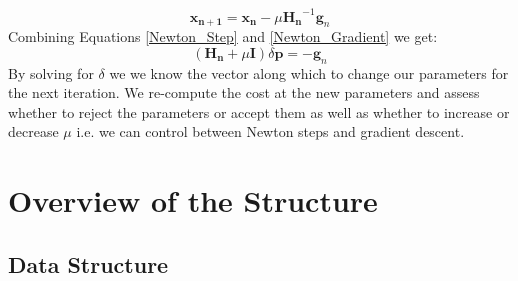 \documentclass[titlepage]{article}
\begin{document}
\begin{equation}
\label{Newton_Gradient}
\mathbf{x_{n+1}}=\mathbf{x_n}-\mu\mathbf{H_n}^{-1} \mathbf{g}_n
\end{equation}
Combining Equations \ref{Newton_Step} and \ref{Newton_Gradient} we get:
\begin{equation}
  \label{Final_Newton_Gradient}
  (\mathbf{H_n}+\mu\mathbf{I})\delta \mathbf{p}= -\mathbf{g}_n
\end{equation}
By solving for $\delta$ we we know the vector along which to change our parameters for the next iteration. We re-compute the cost at the new parameters and assess whether to reject the parameters or accept them as well as whether to increase or decrease $\mu$ i.e. we can control between Newton steps and gradient descent.
\section{Overview of the Structure}
\subsection{Data Structure}
\end{document}
